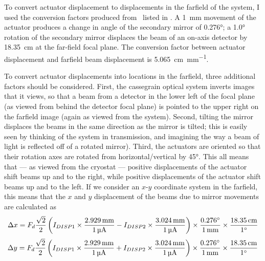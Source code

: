 %
To convert actuator displacement to displacements in the farfield of the system, I used the conversion factors produced from \ZEMAX\ listed in .
A \SI{1}{\mm} movement of the actuator produces a change in angle of the secondary mirror of \ang{0.276}; a \ang{1.0} rotation of the secondary mirror displaces the beam of an on-axis detector by \SI{18.35}{\cm} at the far-field focal plane.
The conversion factor between actuator displacement and farfield beam displacement is \SI{5.065}{\cm\per\mm}.

To convert actuator displacements into locations in the farfield, three additional factors should be considered.
First, the cassegrain optical system inverts images that it views, so that a beam from a detector in the lower left of the focal plane (as viewed from behind the detector focal plane) is pointed to the upper right on the farfield image (again as viewed from the system).
Second, tilting the mirror displaces the beams in the same direction as the mirror is tilted; this is easily seen by thinking of the system in transmission, and imagining the way a beam of light is reflected off of a rotated mirror).
Third, the actuators are oriented so that their rotation axes are rotated from horizontal/vertical by \ang{45}.
This all means that --- as viewed from the cryostat --- positive displacements of the  actuator shift beams up and to the right, while positive displacements of the  actuator shift beams up and to the left.
If we consider an $x$-$y$ coordinate system in the farfield, this means that the $x$ and $y$ displacement of the beams due to mirror movements are calculated as
\begin{equation}
\Delta x = F_d \frac{\sqrt{2}}{2} \left( I_{\DISP1} \times \frac{\SI{2.929}{\mm}}{\SI{1}{\uA}} -
                              I_{\DISP2} \times \frac{\SI{3.024}{\mm}}{\SI{1}{\uA}}  \right) \times
    \frac{\ang{0.276}} {\SI{1}{\mm}} \times
    \frac{\SI{18.35}{\cm}} {\ang{1}}
\end{equation}
\begin{equation}
\Delta y = F_d \frac{\sqrt{2}}{2} \left( I_{\DISP1} \times \frac{\SI{2.929}{\mm}}{\SI{1}{\uA}} +
                              I_{\DISP2} \times \frac{\SI{3.024}{\mm}}{\SI{1}{\uA}}  \right) \times
    \frac{\ang{0.276}} {\SI{1}{\mm}} \times
    \frac{\SI{18.35}{\cm}} {\ang{1}}
\end{equation}

